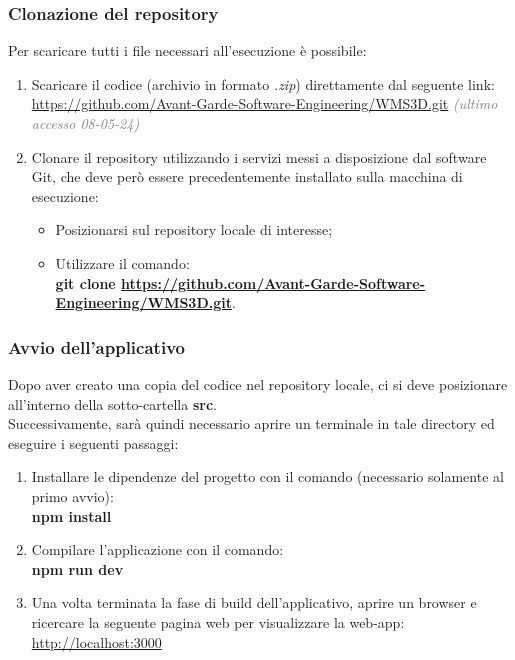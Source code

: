     \subsubsection{Clonazione del repository}\label{sec:install_run:esperto:clone}
    Per scaricare tutti i file necessari all'esecuzione è possibile: 
    \begin{enumerate}
        \item Scaricare il codice (archivio in formato \textit{.zip}) direttamente dal seguente link: \\  
        \url{https://github.com/Avant-Garde-Software-Engineering/WMS3D.git} \textcolor{gray}{\textit{(ultimo accesso 08-05-24)}}
        \item Clonare il repository utilizzando i servizi messi a disposizione dal software Git, che deve però essere precedentemente installato sulla macchina di esecuzione:
        \begin{itemize}
            \item Posizionarsi sul repository locale di interesse;
            \item Utilizzare il comando:\\
            \textbf{git clone \url{https://github.com/Avant-Garde-Software-Engineering/WMS3D.git}}.
        \end{itemize}
    \end{enumerate}

    \subsubsection{Avvio dell'applicativo}\label{sec:install_run:esperto:avvio}
    Dopo aver creato una copia del codice nel repository locale, ci si deve posizionare all'interno della sotto-cartella \textbf{src}. \\
    Successivamente, sarà quindi necessario aprire un terminale in tale directory ed eseguire i seguenti passaggi:
    \begin{enumerate}
        \item Installare le dipendenze del progetto con il comando (necessario solamente al primo avvio): \\
        \textbf{npm install}
        \item Compilare l'applicazione con il comando: \\  
        \textbf{npm run dev}
        \item Una volta terminata la fase di build dell'applicativo, aprire un browser e ricercare la seguente pagina web per visualizzare la web-app: \\  
        \url{http://localhost:3000}
    \end{enumerate}

